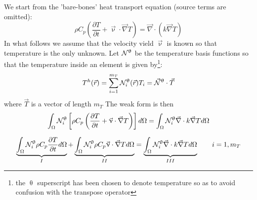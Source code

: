 We start from the 'bare-bones' heat transport equation (source terms are omitted): 
\begin{equation}
\rho C_p \left( \frac{\partial T}{\partial t} + {\vec \upnu}\cdot {\vec\nabla T} \right)
= {\vec \nabla} \cdot \left( k \vec\nabla T \right)
\end{equation}
In what follows we assume that the velocity vield $\vec \upnu$ is known so that temperature is the 
only unknown.
Let ${\mathcal{N}}^\uptheta$ be the temperature basis functions so that the temperature inside an element is 
given by\footnote{the $\uptheta$ superscript has been chosen to denote temperature so as to avoid confusion
with the transpose operator}:
\begin{equation}
T^h({\vec r}) = \sum_{i=1}^{m_T} {\mathcal{N}}^\uptheta_i ({\vec r}) T_i = \vec {{\mathcal{N}}}^\uptheta \cdot \vec T
\end{equation}
where $\vec T$ is a vector of length $m_T$
The weak form is then 
\begin{equation}
\int_\Omega {\mathcal{N}}^\uptheta_i \left[ 
\rho C_p \left( \frac{\partial T}{\partial t} + {\vec \upnu}\cdot {\vec\nabla T} \right) \right] d\Omega
= \int_\Omega  {\mathcal{N}}^\uptheta_i {\vec \nabla} \cdot k \vec\nabla T  d\Omega
\end{equation}

\begin{equation}
\underbrace{\int_\Omega {\mathcal{N}}^\uptheta_i  \rho C_p \frac{\partial T}{\partial t} d\Omega}_{I}
+ \underbrace{\int_\Omega {\mathcal{N}}^\uptheta_i  \rho C_p  {\vec \upnu}\cdot {\vec\nabla T}   d\Omega}_{II}
= \underbrace{\int_\Omega  {\mathcal{N}}^\uptheta_i {\vec \nabla} \cdot k \vec\nabla T d\Omega}_{III}
\quad\quad
i=1,m_T
\end{equation}

